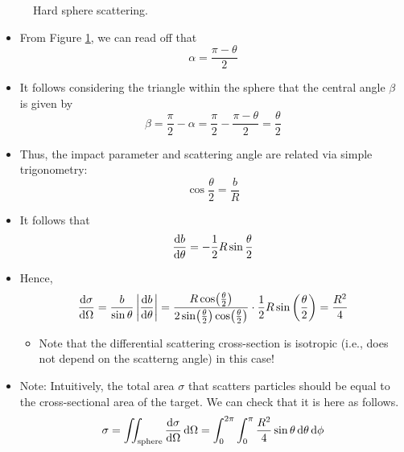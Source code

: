 \documentclass[../notes.tex]{subfiles}
\begin{document}
\begin{itemize}
\begin{figure}[h!]
        \caption{Hard sphere scattering.}
        \label{fig:scatteringHS}
    \end{figure}
    \begin{itemize}
        \item From Figure \ref{fig:scatteringHS}, we can read off that
        \begin{equation*}
            \alpha = \frac{\pi-\theta}{2}
        \end{equation*}
        \item It follows considering the triangle within the sphere that the central angle $\beta$ is given by
        \begin{equation*}
            \beta = \frac{\pi}{2}-\alpha
            = \frac{\pi}{2}-\frac{\pi-\theta}{2}
            = \frac{\theta}{2}
        \end{equation*}
        \item Thus, the impact parameter and scattering angle are related via simple trigonometry:
        \begin{equation*}
            \cos\frac{\theta}{2} = \frac{b}{R}
        \end{equation*}
        \item It follows that
        \begin{equation*}
            \dv{b}{\theta} = -\frac{1}{2}R\sin\frac{\theta}{2}
        \end{equation*}
        \item Hence,
        \begin{equation*}
            \dv{\sigma}{\Omega} = \frac{b}{\sin\theta}\left| \dv{b}{\theta} \right|
            = \frac{R\cos(\frac{\theta}{2})}{2\sin(\frac{\theta}{2})\cos(\frac{\theta}{2})}\cdot\frac{1}{2}R\sin\left( \frac{\theta}{2} \right)
            = \frac{R^2}{4}
        \end{equation*}
        \begin{itemize}
            \item Note that the differential scattering cross-section is isotropic (i.e., does not depend on the scatterng angle) in this case!
        \end{itemize}
        \item Note: Intuitively, the total area $\sigma$ that scatters particles should be equal to the cross-sectional area of the target. We can check that it is here as follows.
        \begin{equation*}
            \sigma = \iint_\text{sphere}\dv{\sigma}{\Omega}\dd{\Omega}
            = \int_0^{2\pi}\int_0^\pi\frac{R^2}{4}\sin\theta\dd{\theta}\dd{\phi}

\end{equation*}
\end{itemize}
\end{itemize}
\end{document}
